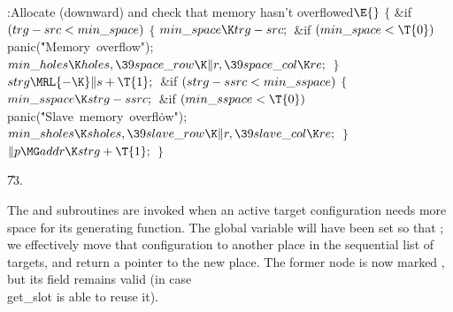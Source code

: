 \B{}:Allocate  (downward) and check that memory
hasn't overflowed\X${}\E{}$\6
${}\{{}$\1\6
\&{if} ${}(\\{trg}-\\{src}<\\{min\_space}){}$\5
${}\{{}$\1\6
${}\\{min\_space}\K\\{trg}-\\{src};{}$\6
\&{if} ${}(\\{min\_space}<\T{0}){}$\1\5
\\{panic}(\.{"Memory\ overflow"});\2\6
${}\\{min\_holes}\K\\{holes},\39\\{space\_row}\K\|r,\39\\{space\_col}\K%
\\{re};{}$\6
\4${}\}{}$\2\6
${}\\{strg}\MRL{-{\K}}\|s+\T{1};{}$\6
\&{if} ${}(\\{strg}-\\{ssrc}<\\{min\_sspace}){}$\5
${}\{{}$\1\6
${}\\{min\_sspace}\K\\{strg}-\\{ssrc};{}$\6
\&{if} ${}(\\{min\_sspace}<\T{0}){}$\1\5
\\{panic}(\.{"Slave\ memory\ overfl}\)\.{ow"});\2\6
${}\\{min\_sholes}\K\\{sholes},\39\\{slave\_row}\K\|r,\39\\{slave\_col}\K%
\\{re};{}$\6
\4${}\}{}$\2\6
${}\|p\MG\\{addr}\K\\{strg}+\T{1};{}$\6
\4${}\}{}$\2\par
\U73.\fi

The  and  subroutines are invoked
when an
active target configuration  needs more space for its generating
function. The global variable  will have been set so that
; we effectively move that configuration
to another
place in the sequential list of targets,
and return a pointer to the new place.
The former node  is now marked , but its 
field remains valid (in case \\{get\_slot} is able to reuse it).

